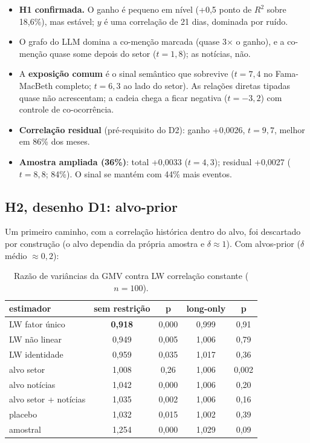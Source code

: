 \documentclass[11pt,a4paper]{article}
\begin{document}
\begin{itemize}
  \item \textbf{H1 confirmada.} O ganho é pequeno em nível (+0,5 ponto de $R^2$ sobre 18,6\%), mas estável; $y$
        é uma correlação de 21 dias, dominada por ruído.
  \item O grafo do LLM domina a co-menção marcada (quase 3$\times$ o ganho), e a co-menção quase some
        depois do setor ($t=1{,}8$); as notícias, não.
  \item A \textbf{exposição comum} é o sinal semântico que sobrevive ($t=7{,}4$ no Fama-MacBeth completo; $t=6{,}3$
        ao lado do setor). As relações diretas tipadas quase não acrescentam; a cadeia chega a ficar
        negativa ($t=-3{,}2$) com controle de co-ocorrência.
  \item \textbf{Correlação residual} (pré-requisito do D2): ganho +0,0026, $t=9{,}7$, melhor em 86\% dos meses.
  \item \textbf{Amostra ampliada (36\%)}: total +0,0033 ($t=4{,}3$); residual +0,0027 ($t=8{,}8$; 84\%). O sinal se
        mantém com 44\% mais eventos.
\end{itemize}

\subsection{H2, desenho D1: alvo-prior}

Um primeiro caminho, com a correlação histórica dentro do alvo, foi descartado por construção (o alvo
dependia da própria amostra e $\delta\approx1$). Com alvos-prior ($\delta$ médio $\approx0{,}2$):

\begin{table}[h]
\centering\small
\begin{tabular}{lcccc}
\toprule
estimador & sem restrição & p & long-only & p \\
\midrule
LW fator único & \textbf{0,918} & 0,000 & 0,999 & 0,91 \\
LW não linear & 0,949 & 0,005 & 1,006 & 0,79 \\
LW identidade & 0,959 & 0,035 & 1,017 & 0,36 \\
alvo setor & 1,008 & 0,26 & 1,006 & 0,002 \\
alvo notícias & 1,042 & 0,000 & 1,006 & 0,20 \\
alvo setor + notícias & 1,035 & 0,002 & 1,006 & 0,16 \\
placebo & 1,032 & 0,015 & 1,002 & 0,39 \\
amostral & 1,254 & 0,000 & 1,029 & 0,09 \\
\bottomrule
\end{tabular}
\caption{Razão de variâncias da GMV contra LW correlação constante ($n=100$).}
\end{table}
\end{document}
